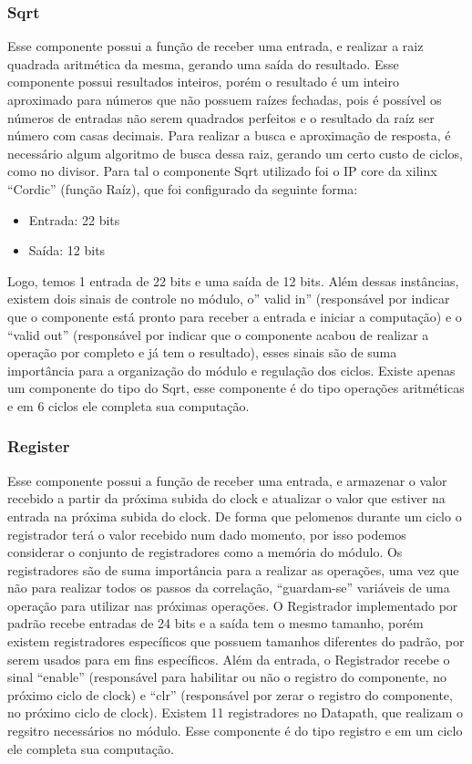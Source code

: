 \subsubsection{Sqrt}
Esse componente possui a função de receber uma entrada, e realizar a raiz quadrada aritmética da mesma, gerando uma saída do resultado. Esse componente possui resultados inteiros, porém o resultado é um inteiro aproximado para números que não possuem raízes fechadas, pois é possível os números de entradas não serem quadrados perfeitos e o resultado da raíz ser número com casas decimais. Para realizar a busca e aproximação de resposta, é necessário algum algoritmo de busca dessa raiz, gerando um certo custo de ciclos, como no divisor. Para tal o componente Sqrt utilizado foi o IP core da xilinx “Cordic” (função Raíz), que foi configurado da seguinte forma: 
\begin{itemize}
\item Entrada: 22 bits
\item Saída: 12 bits
\end{itemize}
Logo, temos 1 entrada de 22 bits e uma saída de 12 bits. Além dessas instâncias, existem dois sinais de controle no módulo, o” valid in” (responsável por indicar que o componente está pronto para receber a entrada e iniciar a computação) e o “valid out” (responsável por indicar que o componente acabou de realizar a operação por completo e já tem o resultado), esses sinais são de suma importância para a organização do módulo e regulação dos ciclos. Existe apenas um componente do tipo do Sqrt, esse componente é do tipo operações aritméticas e em 6 ciclos ele completa sua computação.

\subsubsection{Register}
Esse componente possui a função de receber uma entrada, e armazenar o valor recebido a partir da próxima subida do clock e atualizar o valor que estiver na entrada na próxima subida do clock. De forma que pelomenos durante um ciclo o registrador terá o valor recebido num dado momento, por isso podemos considerar o conjunto de registradores como a memória do módulo. Os registradores são de suma importância para a realizar as operações, uma vez que não para realizar todos os passos da correlação, “guardam-se” variáveis de uma operação para utilizar nas próximas operações. O Registrador implementado por padrão recebe entradas de 24 bits e a saída tem o mesmo tamanho, porém existem registradores específicos que possuem tamanhos diferentes do padrão, por serem usados para em fins específicos. Além da entrada, o Registrador recebe o sinal “enable” (responsável para habilitar ou não o registro do componente, no próximo ciclo de clock) e “clr” (responsável por zerar o registro do componente, no próximo ciclo de clock). Existem 11 registradores no Datapath, que realizam o regsitro necessários no módulo. Esse componente é do tipo registro e em um ciclo ele completa sua computação.
